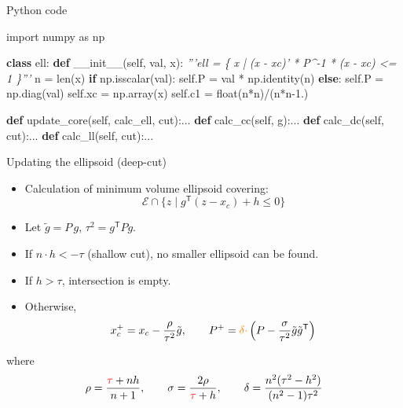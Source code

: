 \documentclass[10pt,ignorenonframetext,serif,onlymath]{beamer}
\newenvironment{Shaded}{}{}
\newcommand{\BuiltInTok}[1]{#1}
\newcommand{\CommentTok}[1]{\textcolor[rgb]{0.38,0.63,0.69}{\textit{#1}}}
\newcommand{\ControlFlowTok}[1]{\textcolor[rgb]{0.00,0.44,0.13}{\textbf{#1}}}
\newcommand{\FloatTok}[1]{\textcolor[rgb]{0.25,0.63,0.44}{#1}}
\newcommand{\FunctionTok}[1]{\textcolor[rgb]{0.02,0.16,0.49}{#1}}
\newcommand{\ImportTok}[1]{#1}
\newcommand{\KeywordTok}[1]{\textcolor[rgb]{0.00,0.44,0.13}{\textbf{#1}}}
\newcommand{\NormalTok}[1]{#1}
\newcommand{\OperatorTok}[1]{\textcolor[rgb]{0.40,0.40,0.40}{#1}}
\newcommand{\VariableTok}[1]{\textcolor[rgb]{0.10,0.09,0.49}{#1}}
\providecommand{\tightlist}{%
  \setlength{\itemsep}{0pt}\setlength{\parskip}{0pt}}
\begin{document}
\begin{frame}[fragile]{Python code}
\protect\hypertarget{python-code}{}

\begin{Shaded}
\begin{Highlighting}[]
\ImportTok{import}\NormalTok{ numpy }\ImportTok{as}\NormalTok{ np}

\KeywordTok{class}\NormalTok{ ell:}
    \KeywordTok{def} \FunctionTok{__init__}\NormalTok{(}\VariableTok{self}\NormalTok{, val, x):}
        \CommentTok{'''ell = \{ x | (x - xc)' * P^-1 * (x - xc) <= 1 \}'''}
\NormalTok{        n }\OperatorTok{=} \BuiltInTok{len}\NormalTok{(x)}
        \ControlFlowTok{if}\NormalTok{ np.isscalar(val):}
            \VariableTok{self}\NormalTok{.P }\OperatorTok{=}\NormalTok{ val }\OperatorTok{*}\NormalTok{ np.identity(n)}
        \ControlFlowTok{else}\NormalTok{:}
            \VariableTok{self}\NormalTok{.P }\OperatorTok{=}\NormalTok{ np.diag(val)}
        \VariableTok{self}\NormalTok{.xc }\OperatorTok{=}\NormalTok{ np.array(x)}
        \VariableTok{self}\NormalTok{.c1 }\OperatorTok{=} \BuiltInTok{float}\NormalTok{(n}\OperatorTok{*}\NormalTok{n)}\OperatorTok{/}\NormalTok{(n}\OperatorTok{*}\NormalTok{n}\FloatTok{-1.}\NormalTok{)}

    \KeywordTok{def}\NormalTok{ update_core(}\VariableTok{self}\NormalTok{, calc_ell, cut):...}
    \KeywordTok{def}\NormalTok{ calc_cc(}\VariableTok{self}\NormalTok{, g):...}
    \KeywordTok{def}\NormalTok{ calc_dc(}\VariableTok{self}\NormalTok{, cut):...}
    \KeywordTok{def}\NormalTok{ calc_ll(}\VariableTok{self}\NormalTok{, cut):...}
\end{Highlighting}
\end{Shaded}

\end{frame}

\begin{frame}{Updating the ellipsoid (deep-cut)}
\protect\hypertarget{updating-the-ellipsoid-deep-cut}{}

\begin{itemize}
\tightlist
\item
  Calculation of minimum volume ellipsoid covering:
  \[\mathcal{E} \cap \{z \mid g^\mathsf{T} (z - x_c) + h \leq 0 \}\]
\item
  Let \(\tilde{g} = P\,g\), \(\tau^2 = g^\mathsf{T} P g\).
\item
  If \(n \cdot h < -\tau\) (shallow cut), no smaller ellipsoid can be
  found.
\item
  If \(h > \tau\), intersection is empty.
\item
  Otherwise, \[x_c^+ = x_c - \frac{\rho}{ \tau^2 } \tilde{g}, \qquad
  P^+ = {\color{orange}\delta\cdot}\left(P - \frac{\sigma}{ \tau^2 } \tilde{g}\tilde{g}^\mathsf{T}\right)\]
\end{itemize}

where \[\rho = \frac{ {\color{red}\tau}+nh}{n+1}, \qquad
  \sigma = \frac{2\rho}{ {\color{red}\tau}+h}, \qquad
  \delta = \frac{n^2(\tau^2 - h^2)}{(n^2 - 1)\tau^2}\]

\end{frame}
\end{document}
